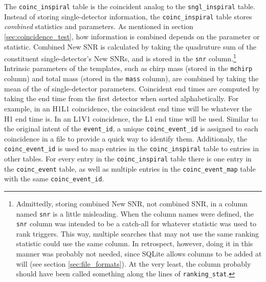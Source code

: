The \texttt{coinc\_inspiral} table is the coincident analog to the
\texttt{sngl\_inspiral} table. Instead of storing single-detector information,
the \texttt{coinc\_inspiral} table stores \emph{combined} statistics and
parameters. As mentioned in section \ref{sec:coincidence_test}, how information
is combined depends on the parameter or statistic. Combined New \ac{SNR} is
calculated by taking the quadruture sum of the constituent single-detector's
New \acp{SNR}, and is stored in the \texttt{snr} column.\footnote{Admittedly,
storing combined New \ac{SNR}, not combined \ac{SNR}, in a column named
\texttt{snr} is a little misleading. When the column names were defined, the
\texttt{snr} column was intended to be a catch-all for whatever statistic was
used to rank triggers. This way, multiple searches that may not use the same
ranking statistic could use the same column. In retrospect, however, doing it
in this manner was probably not needed, since SQLite allows columns to be added
at will (see section \ref{sec:file_formats}). At the very least, the column
probably should have been called something along the lines of
\texttt{ranking\_stat}.} Intrinsic parameters of the templates, such as chirp
mass (stored in the \texttt{mchirp} column) and total mass (stored in the
\texttt{mass} column), are combined by taking the mean of the of
single-detector parameters. Coincident end times are computed by taking the end
time from the first detector when sorted alphabetically. For example, in an
H1L1 coincidence, the coincident end time will be whatever the H1 end time is.
In an L1V1 coincidence, the L1 end time will be used. Similar to the original
intent of the \texttt{event\_id}, a unique \texttt{coinc\_event\_id} is
assigned to each coincidence in a file to provide a quick way to identify them.
Additionaly, the \texttt{coinc\_event\_id} is used to map entries in the
\texttt{coinc\_inspiral} table to entries in other tables. For every entry in
the \texttt{coinc\_inspiral} table there is one entry in the
\texttt{coinc\_event} table, as well as multiple entries in the
\texttt{coinc\_event\_map} table with the same \texttt{coinc\_event\_id}.

